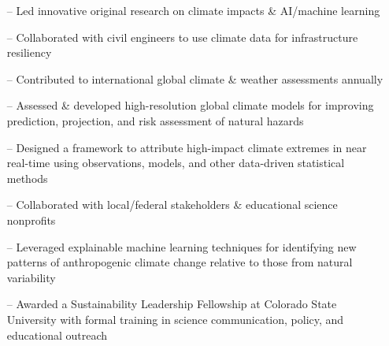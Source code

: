 \documentclass[10pt,letterpaper]{altacv} %
\begin{document}
\begin{itemize}
    \setlength{\itemindent}{0.5em}
    \item[--] \small{Led innovative original research on climate impacts \& AI\slash machine learning}
    \item[--] \small{Collaborated with civil engineers to use climate data for infrastructure resiliency}
    \item[--] \small{Contributed to international global climate \& weather assessments annually}
    \item[--] \small{Assessed \& developed high-resolution global climate models for improving prediction, projection, and risk assessment of natural hazards}

\end{itemize}
\medskip


\begin{itemize}
    \setlength{\itemindent}{0.5em}
    \item[--]   \small{Designed a framework to attribute high-impact climate extremes in near real-time using observations, models, and other data-driven statistical methods}
     \item[--] \small{Collaborated with local\slash federal stakeholders \& educational science nonprofits}
\end{itemize}
\medskip

\begin{itemize}
    \setlength{\itemindent}{0.5em}
    \item[--]   \small{Leveraged explainable machine learning techniques for identifying new patterns of anthropogenic climate change relative to those from natural variability}
    \item[--]    \small{Awarded a Sustainability Leadership Fellowship at Colorado State University with formal training in science communication, policy, and educational outreach}
\end{itemize}
\medskip
\end{document}
